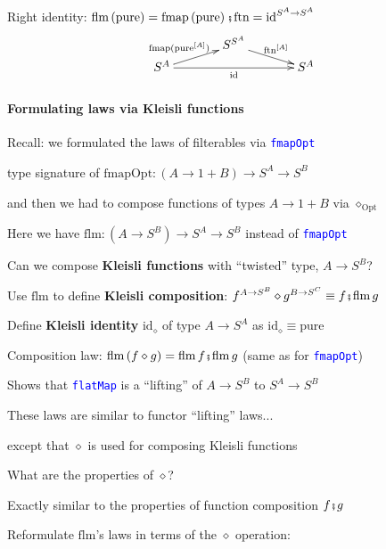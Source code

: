 Right identity: $\text{flm}\left(\text{pure}\right)=\text{fmap}\left(\text{pure}\right)\bef\text{ftn}=\text{id}^{S^{A}\rightarrow S^{A}}$
\[
\xymatrix{\xyScaleY{0.2pc}\xyScaleX{3pc} & S^{S^{A}}\ar[rd]\sp(0.5){\ \text{ftn}^{[A]}\ }\\
S^{A}\ar[ru]\sp(0.5){\text{fmap}(\text{pure}^{[A]})\quad}\ar[rr]\sb(0.5){\text{id}} &  & S^{A}
}
\]


\paragraph{Formulating laws via Kleisli functions}

Recall: we formulated the laws of filterables via \texttt{\textcolor{blue}{\footnotesize{}fmapOpt}} 

type signature of $\text{fmapOpt}:\left(A\rightarrow1+B\right)\rightarrow S^{A}\rightarrow S^{B}$

and then we had to compose functions of types $A\rightarrow1+B$ via
$\diamond_{\text{Opt}}$

Here we have{\small{} $\text{flm}:\left(A\rightarrow S^{B}\right)\rightarrow S^{A}\rightarrow S^{B}$}
instead of \texttt{\textcolor{blue}{\footnotesize{}fmapOpt}} 

Can we compose \textbf{Kleisli functions} with ``twisted'' type,
$A\rightarrow S^{B}$?

Use $\text{flm}$ to define \textbf{Kleisli composition}: $f^{A\rightarrow S^{B}}\diamond g^{B\rightarrow S^{C}}\equiv f\bef\text{flm}\,g$

Define \textbf{Kleisli identity} $\text{id}_{\diamond}$ of type $A\rightarrow S^{A}$
as $\text{id}_{\diamond}\equiv\text{pure}$

Composition law: $\text{flm}\left(f\diamond g\right)=\text{flm}\,f\bef\text{flm}\,g$
(same as for \texttt{\textcolor{blue}{\footnotesize{}fmapOpt}})

Shows that \texttt{\textcolor{blue}{\footnotesize{}flatMap}} is a
``lifting'' of $A\rightarrow S^{B}$ to $S^{A}\rightarrow S^{B}$

These laws are similar to functor ``lifting'' laws...

except that $\diamond$ is used for composing Kleisli functions

What are the properties of $\diamond$?

Exactly similar to the properties of function composition $f\bef g$

Reformulate $\text{flm}$'s laws in terms of the $\diamond$ operation:

